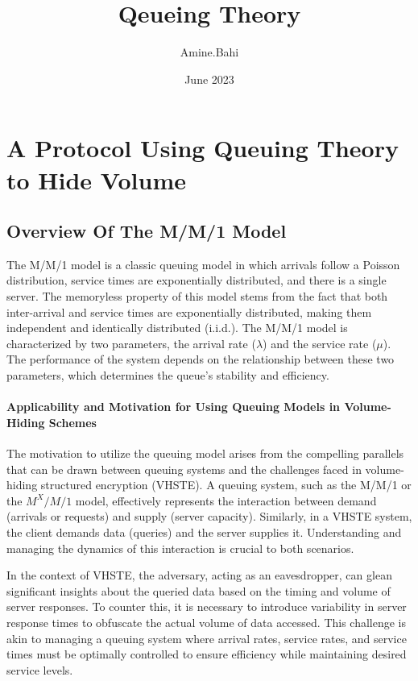 \documentclass{article}
\title{Qeueing Theory}
\author{Amine.Bahi }
\date{June 2023}
\begin{document}
\maketitle


\section{A Protocol Using Queuing Theory to Hide Volume}

\subsection{Overview Of The M/M/1 Model}

The M/M/1 model is a classic queuing model in which arrivals follow a Poisson distribution, service times are exponentially distributed, and there is a single server. The memoryless property of this model stems from the fact that both inter-arrival and service times are exponentially distributed, making them independent and identically distributed (i.i.d.). The M/M/1 model is characterized by two parameters, the arrival rate ($\lambda$) and the service rate ($\mu$). The performance of the system depends on the relationship between these two parameters, which determines the queue's stability and efficiency.

\paragraph{Applicability and Motivation for Using Queuing Models in Volume-Hiding Schemes}
\label{par:applicability_and_motivation_for_using_queuing models_in_volume-Hiding_schemes}
The motivation to utilize the queuing model arises from the compelling parallels that can be drawn between queuing systems and the challenges faced in volume-hiding structured encryption (VHSTE). A queuing system, such as the M/M/1 or the $M^X/M/1$ model, effectively represents the interaction between demand (arrivals or requests) and supply (server capacity). Similarly, in a VHSTE system, the client demands data (queries) and the server supplies it. Understanding and managing the dynamics of this interaction is crucial to both scenarios.

In the context of VHSTE, the adversary, acting as an eavesdropper, can glean significant insights about the queried data based on the timing and volume of server responses. To counter this, it is necessary to introduce variability in server response times to obfuscate the actual volume of data accessed. This challenge is akin to managing a queuing system where arrival rates, service rates, and service times must be optimally controlled to ensure efficiency while maintaining desired service levels.
\end{document}
